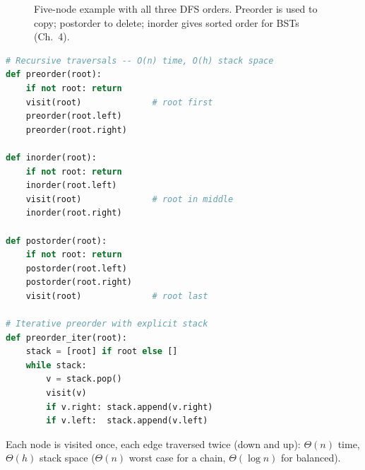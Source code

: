 \begin{figure}[h]
\centering
{}
\caption{Five-node example with all three DFS orders. Preorder is used to copy; postorder to delete; inorder gives sorted order for BSTs (Ch.~4).}
\label{fig:traversal-orders}
\end{figure}

\begin{lstlisting}[language=Python]
# Recursive traversals -- O(n) time, O(h) stack space
def preorder(root):
    if not root: return
    visit(root)              # root first
    preorder(root.left)
    preorder(root.right)

def inorder(root):
    if not root: return
    inorder(root.left)
    visit(root)              # root in middle
    inorder(root.right)

def postorder(root):
    if not root: return
    postorder(root.left)
    postorder(root.right)
    visit(root)              # root last

# Iterative preorder with explicit stack
def preorder_iter(root):
    stack = [root] if root else []
    while stack:
        v = stack.pop()
        visit(v)
        if v.right: stack.append(v.right)
        if v.left:  stack.append(v.left)
\end{lstlisting}

Each node is visited once, each edge traversed twice (down and up): $\Theta(n)$ time, $\Theta(h)$ stack space ($\Theta(n)$ worst case for a chain, $\Theta(\log n)$ for balanced).

